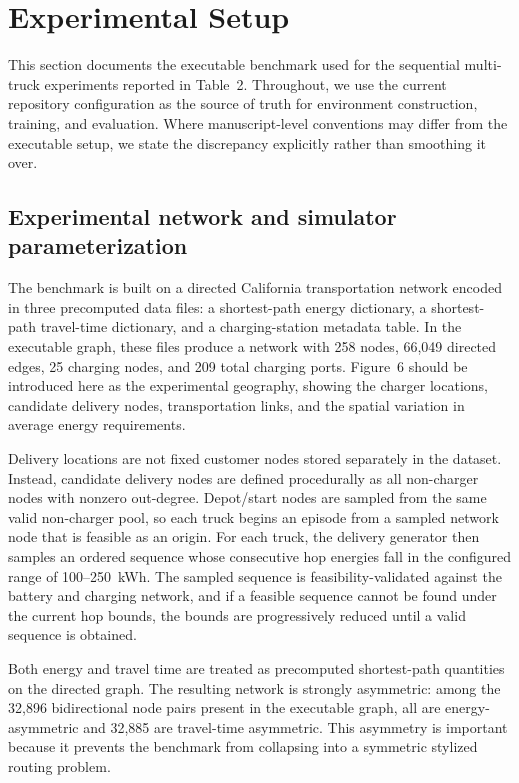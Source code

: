 \section{Experimental Setup}
\label{sec:experimental-setup}

This section documents the executable benchmark used for the sequential multi-truck experiments reported in Table~2. Throughout, we use the current repository configuration as the source of truth for environment construction, training, and evaluation. Where manuscript-level conventions may differ from the executable setup, we state the discrepancy explicitly rather than smoothing it over.

\subsection{Experimental network and simulator parameterization}
\label{sec:experimental-network}

The benchmark is built on a directed California transportation network encoded in three precomputed data files: a shortest-path energy dictionary, a shortest-path travel-time dictionary, and a charging-station metadata table. In the executable graph, these files produce a network with 258 nodes, 66{,}049 directed edges, 25 charging nodes, and 209 total charging ports. Figure~6 should be introduced here as the experimental geography, showing the charger locations, candidate delivery nodes, transportation links, and the spatial variation in average energy requirements.

Delivery locations are not fixed customer nodes stored separately in the dataset. Instead, candidate delivery nodes are defined procedurally as all non-charger nodes with nonzero out-degree. Depot/start nodes are sampled from the same valid non-charger pool, so each truck begins an episode from a sampled network node that is feasible as an origin. For each truck, the delivery generator then samples an ordered sequence whose consecutive hop energies fall in the configured range of 100--250~kWh. The sampled sequence is feasibility-validated against the battery and charging network, and if a feasible sequence cannot be found under the current hop bounds, the bounds are progressively reduced until a valid sequence is obtained.

Both energy and travel time are treated as precomputed shortest-path quantities on the directed graph. The resulting network is strongly asymmetric: among the 32{,}896 bidirectional node pairs present in the executable graph, all are energy-asymmetric and 32{,}885 are travel-time asymmetric. This asymmetry is important because it prevents the benchmark from collapsing into a symmetric stylized routing problem.

